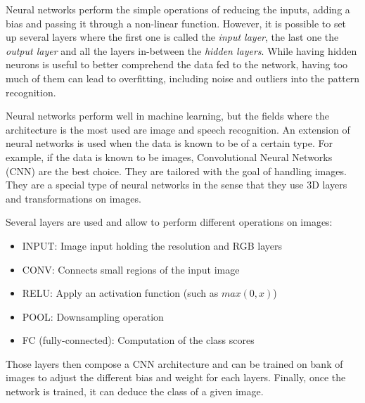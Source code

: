 Neural networks perform the simple operations of reducing the inputs, adding a bias and passing it through a non-linear function. However, it is possible to set up several layers where the first one is called the \emph{input layer}, the last one the \emph{output layer} and all the layers in-between the \emph{hidden layers}. While having hidden neurons is useful to better comprehend the data fed to the network, having too much of them can lead to overfitting, including noise and outliers into the pattern recognition.

Neural networks perform well in machine learning, but the fields where the architecture is the most used are image and speech recognition. An extension of neural networks is used when the data is known to be of a certain type. For example, if the data is known to be images, Convolutional Neural Networks (CNN) are the best choice. They are tailored with the goal of handling images. They are a special type of neural networks in the sense that they use 3D layers and transformations on images.


Several layers are used and allow to perform different operations on images:
\begin{itemize}
  \item INPUT: Image input holding the resolution and RGB layers
  \item CONV: Connects small regions of the input image
  \item RELU: Apply an activation function (such as $max(0,x)$)
  \item POOL: Downsampling operation
  \item FC (fully-connected): Computation of the class scores
\end{itemize}

Those layers then compose a CNN architecture and can be trained on bank of images to adjust the different bias and weight for each layers. Finally, once the network is trained, it can deduce the class of a given image.


